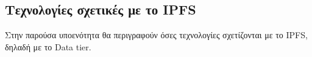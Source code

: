 \subsection{Τεχνολογίες σχετικές με το IPFS}

Στην παρούσα υποενότητα θα περιγραφούν όσες τεχνολογίες σχετίζονται με το IPFS, δηλαδή με το Data tier.


